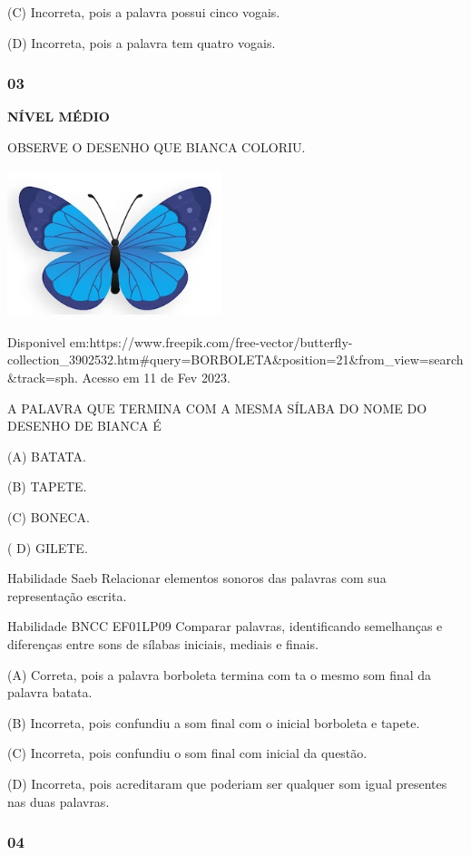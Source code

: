 \begin{escola}
(C) Incorreta, pois a palavra possui cinco vogais.

(D) Incorreta, pois a palavra tem quatro vogais.

\subsubsection{03}\label{section-59}

\textbf{NÍVEL MÉDIO}

OBSERVE O DESENHO QUE BIANCA COLORIU.

\includegraphics[width=2.45833in,height=1.69432in]{media/image227.png}

Disponivel
em:https://www.freepik.com/free-vector/butterfly-collection\_3902532.htm\#query=BORBOLETA\&position=21\&from\_view=search\&track=sph.
Acesso em 11 de Fev 2023.

A PALAVRA QUE TERMINA COM A MESMA SÍLABA DO NOME DO DESENHO DE BIANCA É

(A) BATATA.

(B) TAPETE.

(C) BONECA.

( D) GILETE.

Habilidade Saeb Relacionar elementos sonoros das palavras com sua
representação escrita.

Habilidade BNCC EF01LP09 Comparar palavras, identificando semelhanças e
diferenças entre sons de sílabas iniciais, mediais e finais.

(A) Correta, pois a palavra borboleta termina com ta o mesmo som final
da palavra batata.

(B) Incorreta, pois confundiu a som final com o inicial borboleta e
tapete.

(C) Incorreta, pois confundiu o som final com inicial da questão.

(D) Incorreta, pois acreditaram que poderiam ser qualquer som igual
presentes nas duas palavras.

\subsubsection{04}\label{section-60}


\end{escola}
